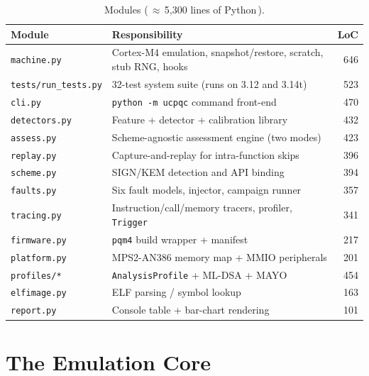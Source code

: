 \documentclass[11pt]{article}
\newcommand{\code}[1]{\texttt{#1}}
\begin{document}
\begin{table}[h]
\centering\small
\caption{Modules (\,$\approx$\,5{,}300 lines of Python\,).}
\label{tab:modules}
\begin{tabular}{@{}llr@{}}
\toprule
Module & Responsibility & LoC \\
\midrule
\code{machine.py}      & Cortex-M4 emulation, snapshot/restore, scratch, stub RNG, hooks & 646 \\
\code{tests/run\_tests.py} & 32-test system suite (runs on 3.12 and 3.14t)          & 523 \\
\code{cli.py}          & \code{python -m ucpqc} command front-end                    & 470 \\
\code{detectors.py}    & Feature + detector + calibration library                    & 432 \\
\code{assess.py}       & Scheme-agnostic assessment engine (two modes)               & 423 \\
\code{replay.py}       & Capture-and-replay for intra-function skips                 & 396 \\
\code{scheme.py}       & SIGN/KEM detection and API binding                          & 394 \\
\code{faults.py}       & Six fault models, injector, campaign runner                 & 357 \\
\code{tracing.py}      & Instruction/call/memory tracers, profiler, \code{Trigger}   & 341 \\
\code{firmware.py}     & \code{pqm4} build wrapper + manifest                        & 217 \\
\code{platform.py}     & MPS2-AN386 memory map + MMIO peripherals                     & 201 \\
\code{profiles/*}      & \code{AnalysisProfile} + ML-DSA + MAYO                      & 454 \\
\code{elfimage.py}     & ELF parsing / symbol lookup                                  & 163 \\
\code{report.py}       & Console table + bar-chart rendering                         & 101 \\
\bottomrule
\end{tabular}
\end{table}

\section{The Emulation Core}
\end{document}
